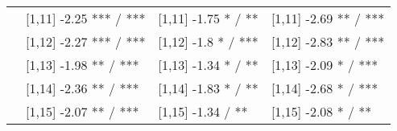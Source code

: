 \begin{table}
\begin{tabular}[t]{llll}
 & {}[1,11] -2.25 *** / *** & {}[1,11] -1.75 * / ** & {}[1,11] -2.69 ** / ***\\
 & {}[1,12] -2.27 *** / *** & {}[1,12] -1.8 * / *** & {}[1,12] -2.83 ** / ***\\
\addlinespace
 & {}[1,13] -1.98 ** / *** & {}[1,13] -1.34 * / ** & {}[1,13] -2.09 * / ***\\
 & {}[1,14] -2.36 ** / *** & {}[1,14] -1.83 * / ** & {}[1,14] -2.68 * / ***\\
 & {}[1,15] -2.07 ** / *** & {}[1,15] -1.34  / ** & {}[1,15] -2.08 * / **\\
\bottomrule
\end{tabular}
\end{table}
